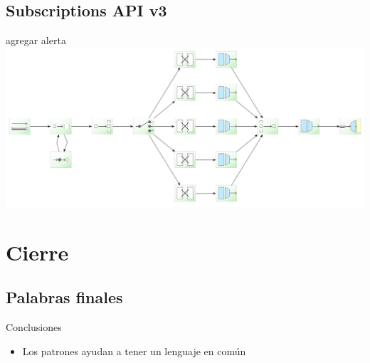 \documentclass{beamer}
\begin{document}
\subsection{Subscriptions API v3}
\begin{frame}{agregar alerta}
\includegraphics[width=1.0\linewidth]{subs-v3-add}
\end{frame}


\section{Cierre}
\subsection{Palabras finales}

\begin{frame}{Conclusiones}
\begin{itemize}
\item Los patrones ayudan a tener un lenguaje en común
\end{itemize}
\end{frame}
\end{document}
